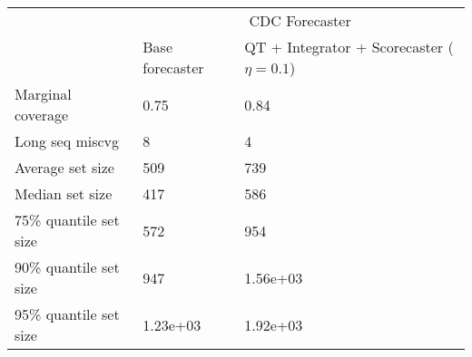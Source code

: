 \begin{tabular}{lll}
\toprule
& \multicolumn{2}{c}{CDC Forecaster} \\
& Base forecaster & QT + Integrator + Scorecaster ($\eta=0.1$) \\
\midrule
Marginal coverage & 0.75 & 0.84 \\
Long seq miscvg & 8 & 4 \\
Average set size & 509 & 739 \\
Median set size & 417 & 586 \\
75\% quantile set size & 572 & 954 \\
90\% quantile set size & 947 & 1.56e+03 \\
95\% quantile set size & 1.23e+03 & 1.92e+03 \\
\bottomrule
\end{tabular}
